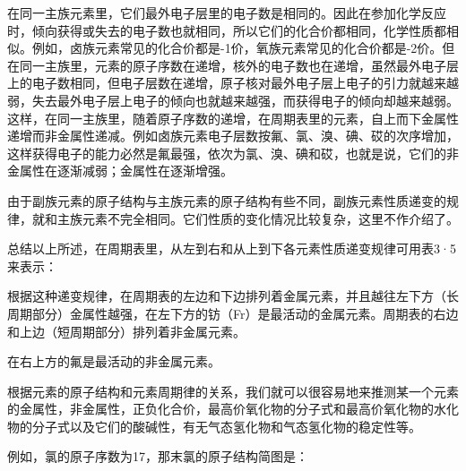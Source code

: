 在同一主族元素里，它们最外电子层里的电子数是相同的。因此在参加化学反应时，倾向获得或失去的电子数也就相同，所以它们的化合价都相同，化学性质都相似。例如，卤族元素常见的化合价都是-1价，氧族元素常见的化合价都是-2价。但在同一主族里，元素的原子序数在递增，核外的电子数也在递增，虽然最外电子层上的电子数相同，但电子层数在递增，原子核对最外电子层上电子的引力就越来越弱，失去最外电子层上电子的倾向也就越来越强，而获得电子的倾向却越来越弱。这样，在同一主族里，随着原子序数的递增，在周期表里的元素，自上而下金属性递增而非金属性递减。例如卤族元素电子层数按氟、氯、溴、碘、砹的次序增加，这样获得电子的能力必然是氟最强，依次为氯、溴、碘和砹，也就是说，它们的非金属性在逐渐减弱；金属性在逐渐增强。

由于副族元素的原子结构与主族元素的原子结构有些不同，副族元素性质递变的规律，就和主族元素不完全相同。它们性质的变化情况比较复杂，这里不作介绍了。

总结以上所述，在周期表里，从左到右和从上到下各元素性质递变规律可用表3·5来表示：

根据这种递变规律，在周期表的左边和下边排列着金属元素，并且越往左下方（长周期部分）金属性越强，在左下方的钫（Fr）是最活动的金属元素。周期表的右边和上边（短周期部分）排列着非金属元素。

{\centering
\small\setlength{\tabcolsep}{3pt}%
\par
}

在右上方的氟是最活动的非金属元素。

根据元素的原子结构和元素周期律的关系，我们就可以很容易地来推测某一个元素的金属性，非金属性，正负化合价，最高价氧化物的分子式和最高价氧化物的水化物的分子式以及它们的酸碱性，有无气态氢化物和气态氢化物的稳定性等。

例如，氯的原子序数为17，那末氯的原子结构简图是：


